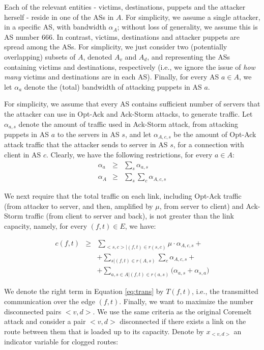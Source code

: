 \documentclass[conference]{IEEEtran}
\newcommand{\atkbw}{\alpha}
\newcommand{\ampfact}{\mu}
\begin{document}
Each of the relevant entities - victims, destinations, puppets and the attacker herself - reside in one of the ASs in $A$. For simplicity, we assume a single attacker, in a specific AS, with bandwidth $\atkbw_A$; without loss of generality, we assume this is AS number $666$. In contrast, victims, destinations and attacker puppets are spread among the ASs. For simplicity, we just consider two (potentially overlapping) subsets of $A$, denoted $A_v$ and $A_d$, and  representing the ASs containing victims and destinations, respectively (i.e., we ignore the issue of {\em how many} victims and destinations are in each AS). Finally, for every AS $a\in A$, we let $\atkbw_a$ denote the (total) bandwidth of attacking puppets in AS $a$. 

For simplicity, we assume that every AS contains sufficient number of servers that the attacker can use in Opt-Ack and Ack-Storm attacks, to generate traffic. Let $\atkbw_{a,s}$ denote the amount of traffic used in Ack-Storm attack, from attacking puppets in AS $a$ to the servers in AS $s$, and let $\atkbw_{A,c,s}$ be the amount of Opt-Ack attack traffic that the attacker sends to server in AS $s$, for a connection with client in AS $c$. Clearly, we have the following restrictions, for every $a\in A$: 
\begin{eqnarray}
\atkbw_a & \geq &\sum_s \atkbw_{a,s} \\
\atkbw_A & \geq & \sum_s \sum_c \atkbw_{A,c,s} 
\end{eqnarray}

We next require that the total traffic on each link, including Opt-Ack traffic (from attacker to server, and then, amplified by $\ampfact$, from server to client) and Ack-Storm traffic (from client to server and back), is not greater than the link capacity, namely, for every $(f,t)\in E$, we have: 

\begin{eqnarray}
c(f,t) & \geq & \sum_{<s,c>|(f,t)\in r(s,c)} \ampfact \cdot \atkbw_{A,c,s} + \nonumber \\
       &      & + \sum_{s| (f,t)\in r(A,s)} \sum_c \atkbw_{A,c,s} + \nonumber \\
       &      & + \sum_{a,s\in A|(f,t)\in r(a,s)} \big( \atkbw_{a,s}+\atkbw_{s,a} \big)
\label{eq:trans}
\end{eqnarray}

We denote the right term in Equation \ref{eq:trans} by $T(f,t)$, i.e., the transmitted communication over the edge $(f,t)$.
Finally, we want to maximize the number disconnected pairs $<v,d>$. We use the same criteria as the original Coremelt attack and consider a pair $<v,d>$ disconnected if there exists a link on the route between them that is loaded up to its capacity. Denote by $x_{<v,d>}$ an indicator variable for clogged routes:
\end{document}
